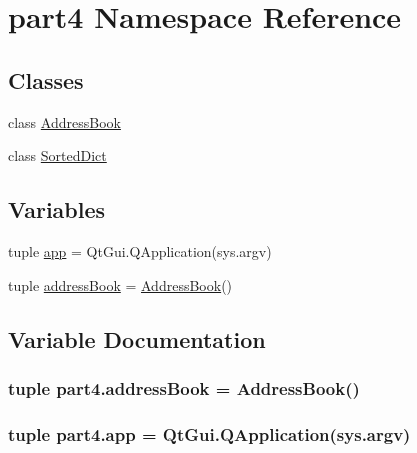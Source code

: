 \hypertarget{namespacepart4}{}\section{part4 Namespace Reference}
\label{namespacepart4}
\subsection*{Classes}
\begin{DoxyCompactItemize}
\item 
class \hyperlink{classpart4_1_1AddressBook}{Address\+Book}
\item 
class \hyperlink{classpart4_1_1SortedDict}{Sorted\+Dict}
\end{DoxyCompactItemize}
\subsection*{Variables}
\begin{DoxyCompactItemize}
\item 
tuple \hyperlink{namespacepart4_af82131a57616b3e90a102e2a6e435510}{app} = Qt\+Gui.\+Q\+Application(sys.\+argv)
\item 
tuple \hyperlink{namespacepart4_a323648a80f5b20c16b018c009c513f59}{address\+Book} = \hyperlink{classpart4_1_1AddressBook}{Address\+Book}()
\end{DoxyCompactItemize}


\subsection{Variable Documentation}
\hypertarget{namespacepart4_a323648a80f5b20c16b018c009c513f59}{}
\subsubsection[{address\+Book}]{\setlength{\rightskip}{0pt plus 5cm}tuple part4.\+address\+Book = {\bf Address\+Book}()}\label{namespacepart4_a323648a80f5b20c16b018c009c513f59}
\hypertarget{namespacepart4_af82131a57616b3e90a102e2a6e435510}{}
\subsubsection[{app}]{\setlength{\rightskip}{0pt plus 5cm}tuple part4.\+app = Qt\+Gui.\+Q\+Application(sys.\+argv)}\label{namespacepart4_af82131a57616b3e90a102e2a6e435510}
